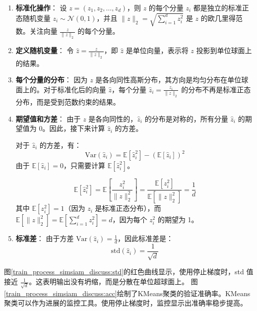 \documentclass[master]{thesis-uestc}
\begin{document}
\begin{enumerate}
    \item \textbf{标准化操作}：
    设 \( z = (z_1, z_2, \dots, z_d) \)，则 \( z \) 的每个分量 \( z_i \) 都是独立的标准正态随机变量 \( z_i \sim \mathcal{N}(0, 1) \)，并且 \( \|z\|_2 = \sqrt{\sum_{i=1}^{d} z_i^2} \) 是 \( z \) 的欧几里得范数。关注向量 \( \frac{z}{\|z\|_2} \) 的每个分量。

    \item \textbf{定义随机变量}：
    令 \( \hat{z} = \frac{z}{\|z\|_2} \)，即 \( \hat{z} \) 是单位向量，表示将 \( z \) 投影到单位球面上的结果。

    \item \textbf{每个分量的分布}：
    因为 \( z \) 是各向同性高斯分布，其方向是均匀分布在单位球面上的。对于标准化后的向量 \( \hat{z} \)，每个分量 \( \hat{z}_i = \frac{z_i}{\|z\|_2} \) 的分布不再是标准正态分布，而是受到范数约束的结果。

    \item \textbf{期望值和方差}：
    由于 \( z \) 是各向同性的，\( \hat{z}_i \) 的分布是对称的，所有分量 \( \hat{z}_i \) 的期望值为 0。因此，接下来计算 \( \hat{z}_i \) 的方差。

    对于 \( \hat{z}_i \) 的方差，有：
    \begin{equation}
    \text{Var}(\hat{z}_i) = \mathbb{E}[\hat{z}_i^2] - (\mathbb{E}[\hat{z}_i])^2
    \end{equation}
    由于 \( \mathbb{E}[\hat{z}_i] = 0 \)，只需要计算 \( \mathbb{E}[\hat{z}_i^2] \)。

    \begin{equation}
    \mathbb{E}[\hat{z}_i^2] = \mathbb{E}\left[\frac{z_i^2}{\|z\|_2^2}\right] = \frac{\mathbb{E}[z_i^2]}{\mathbb{E}[\|z\|_2^2]} = \frac{1}{d}
    \end{equation}
    其中 \( \mathbb{E}[z_i^2] = 1 \)（因为 \( z_i \) 是标准正态分布），而 \( \mathbb{E}[\|z\|_2^2] = \mathbb{E}[\sum_{i=1}^{d} z_i^2] = d \)，因为每个 \( z_i^2 \) 的期望为 1。

    \item \textbf{标准差}：
    由于方差 \( \text{Var}(\hat{z}_i) = \frac{1}{d} \)，因此标准差是：
    \begin{equation}
    \text{std}(\hat{z}_i) = \frac{1}{\sqrt{d}}
    \end{equation}
\end{enumerate}


图\ref{train_process_simsiam_discuss:std}的红色曲线显示，使用停止梯度时，std 值接近 \( \frac{1}{\sqrt{d}} \)。这表明输出没有坍缩，而是分散在单位超球面上。
图\ref{train_process_simsiam_discuss:acc}绘制了KMeans聚类的验证准确率。KMeans聚类可以作为进展的监控工具。使用停止梯度时，监控显示出准确率稳步提高。
\end{document}
